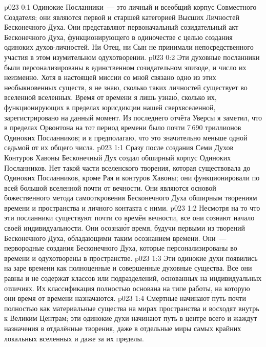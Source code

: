 \author{Божественный Советник}
\vs p023 0:1 Одинокие Посланники~--- это личный и всеобщий корпус Совместного Создателя; они являются первой и старшей категорией Высших Личностей Бесконечного Духа. Они представляют первоначальный созидательный акт Бесконечного Духа, функционирующего в одиночестве с целью создания одиноких духов\hyp{}личностей. Ни Отец, ни Сын не принимали непосредственного участия в этом изумительном одухотворении.
\vs p023 0:2 Эти духовные посланники были персонализированы в единственном созидательном эпизоде, и число их неизменно. Хотя в настоящей миссии со мной связано одно из этих необыкновенных существ, я не знаю, сколько таких личностей существует во вселенной вселенных. Время от времени я лишь узна\'ю, сколько их, функционирующих в пределах юрисдикции нашей сверхвселенной, зарегистрировано на данный момент. Из последнего отчёта Уверсы я заметил, что в пределах Орвонтона на тот период времени было почти 7\,690 триллионов Одиноких Посланников; и я предполагаю, что это значительно меньше одной седьмой от их общего числа.
\vs p023 1:1 Сразу после создания Семи Духов Контуров Хавоны Бесконечный Дух создал обширный корпус Одиноких Посланников. Нет такой части вселенского творения, которая существовала до Одиноких Посланников, кроме Рая и контуров Хавоны; они функционировали по всей большой вселенной почти от вечности. Они являются основой божественного метода самооткровения Бесконечного Духа обширным творениям времени и пространства и личного контакта с ними.
\vs p023 1:2 Несмотря на то что эти посланники существуют почти со времён вечности, все они сознают начало своей индивидуальности. Они осозна\'ют время, будучи первыми из творений Бесконечного Духа, обладающими таким осознанием времени. Они~--- первородные создания Бесконечного Духа, которые персонализированы во времени и одухотворены в пространстве.
\vs p023 1:3 Эти одинокие духи появились на заре времени как полноценные и совершенные духовные существа. Все они равны и не содержат классов или подразделений, основанных на индивидуальных отличиях. Их классификация полностью основана на типе работы, на которую они время от времени назначаются.
\vs p023 1:4 Смертные начинают путь почти полностью как материальные существа на мирах пространства и восходят внутрь к Великим Центрам; эти одинокие духи начинают путь в центре всего и жаждут назначения в отдалённые творения, даже в отдельные миры самых крайних локальных вселенных и даже за их пределы.
